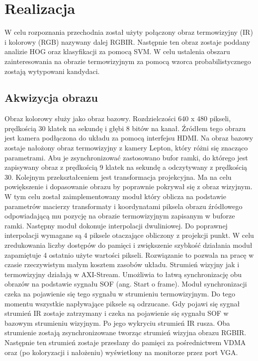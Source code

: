 \chapter{Realizacja}
\label{cha:real}
W celu rozpoznania przechodnia został użyty połączony obraz termowizyjny (IR) i kolorowy (RGB) nazywany dalej RGBIR. Następnie ten obraz zostaje poddany analizie HOG oraz klasyfikacji za pomocą SVM. W celu ustalenia obszaru zainteresowania na obrazie termowizyjnym za pomocą wzorca probabilistycznego zostają wytypowani kandydaci.

\section{Akwizycja obrazu}
Obraz kolorowy służy jako obraz bazowy. Rozdzielczości 640 x 480 pikseli, prędkością 30 klatek na sekundę i głębi 8 bitów na kanał. Źródłem tego obrazu jest kamera podłączona do układu za pomocą interfejsu HDMI. Na obraz bazowy zostaje nałożony obraz termowizyjny z kamery Lepton, który różni się znacząco parametrami. Abu je zsynchronizować zastosowano bufor ramki, do którego jest zapisywany obraz z prędkością 9 klatek na sekundę a odczytywany z prędkością 30. Kolejnym przekształceniem jest transformacja projekcyjna. Ma na celu powiększenie i dopasowanie obrazu by poprawnie pokrywał się z obraz wizyjnym. W tym celu został zaimplementowany moduł który oblicza na podstawie parametrów macierzy transformaty i koordynatami piksela obrazu źródłowego odpowiadającą mu pozycję na obrazie termowizyjnym zapisanym w buforze ramki. Następny moduł dokonuje interpolacji dwuliniowej. Do poprawnej interpolacji wymagane są 4 piksele otaczające obliczony z projekcji punkt. W celu zredukowania liczby dostępów do pamięci i zwiększenie szybkość działania moduł zapamiętuje 4 ostatnio użyte wartości pikseli. Rozwiązanie to pozwala na pracę w czasie rzeczywistym małym kosztem zasobów układu.
Strumień wizyjny jak i termowizyjny działają w AXI-Stream. Umożliwia to łatwą synchronizację obu obrazów na podstawie sygnału SOF (ang. Start o frame). Moduł synchronizacji czeka na pojawienie się tego sygnału w strumieniu termowizyjnym. Do tego momentu wszystkie napływające piksele są odrzucane. Gdy pojawi się sygnał strumień IR zostaje zatrzymany i czeka na pojawienie się sygnału SOF w bazowym strumieniu wizyjnym. Po jego wykryciu strumień IR rusza. Oba strumienie zostają zsynchronizowane tworząc strumień wizyjna obrazu RGBIR. Następnie ten strumień zostaje przesłany do pamięci za pośrednictwem VDMA oraz (po koloryzacji i nałożeniu) wyświetlony na monitorze przez port VGA.

